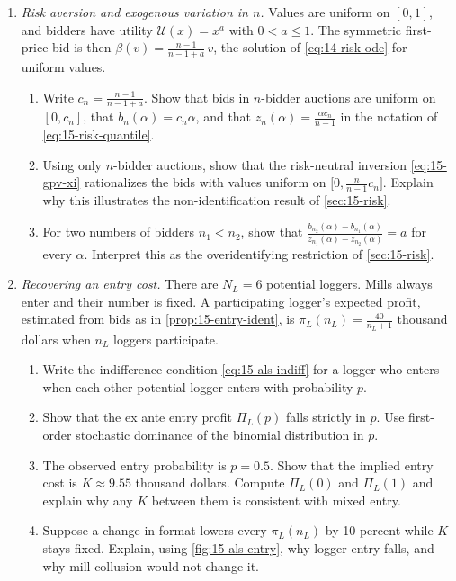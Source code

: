 \begin{enumerate}[label=\arabic*., leftmargin=*, itemsep=6pt]
\item \textit{Risk aversion and exogenous variation in $n$.} Values are uniform on $[0,1]$, and bidders have
utility $\mathcal U(x)=x^{a}$ with $0<a\le1$. The symmetric first-price bid is then
$\beta(v)=\frac{n-1}{n-1+a}\,v$, the solution of \eqref{eq:14-risk-ode} for uniform values.
\begin{enumerate}[label=(\alph*)]
  \item Write $c_n=\frac{n-1}{n-1+a}$. Show that bids in $n$-bidder auctions are uniform on $[0,c_n]$, that
  $b_n(\alpha)=c_n\alpha$, and that $z_n(\alpha)=\frac{\alpha c_n}{n-1}$ in the notation of
  \eqref{eq:15-risk-quantile}.
  \item Using only $n$-bidder auctions, show that the risk-neutral inversion \eqref{eq:15-gpv-xi} rationalizes the
  bids with values uniform on $\big[0,\frac{n}{n-1}c_n\big]$. Explain why this illustrates the non-identification
  result of \cref{sec:15-risk}.
  \item For two numbers of bidders $n_1<n_2$, show that
  $\frac{b_{n_2}(\alpha)-b_{n_1}(\alpha)}{z_{n_1}(\alpha)-z_{n_2}(\alpha)}=a$ for every $\alpha$. Interpret this as
  the overidentifying restriction of \cref{sec:15-risk}.
\end{enumerate}

\item \textit{Recovering an entry cost.} There are $N_L=6$ potential loggers. Mills always enter and their number
is fixed. A participating logger's expected profit, estimated from bids as in \cref{prop:15-entry-ident}, is
$\pi_L(n_L)=\frac{40}{n_L+1}$ thousand dollars when $n_L$ loggers participate.
\begin{enumerate}[label=(\alph*)]
  \item Write the indifference condition \eqref{eq:15-als-indiff} for a logger who enters when each other potential
  logger enters with probability $p$.
  \item Show that the ex ante entry profit $\Pi_L(p)$ falls strictly in $p$. Use first-order stochastic
  dominance of the binomial distribution in $p$.
  \item The observed entry probability is $p=0.5$. Show that the implied entry cost is $K\approx9.55$ thousand
  dollars. Compute $\Pi_L(0)$ and $\Pi_L(1)$ and explain why any $K$ between them is consistent with mixed
  entry.
  \item Suppose a change in format lowers every $\pi_L(n_L)$ by 10 percent while $K$ stays fixed. Explain, using
  \cref{fig:15-als-entry}, why logger entry falls, and why mill collusion would not change it.
\end{enumerate}


\end{enumerate}
